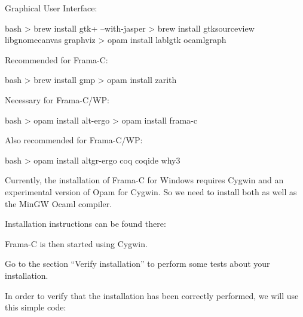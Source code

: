 Graphical User Interface:



\begin{CodeBlock}{bash}
> brew install gtk+ --with-jasper
> brew install gtksourceview libgnomecanvas graphviz
> opam install lablgtk ocamlgraph 
\end{CodeBlock}



Recommended for Frama-C:



\begin{CodeBlock}{bash}
> brew install gmp
> opam install zarith
\end{CodeBlock}



Necessary for Frama-C/WP:



\begin{CodeBlock}{bash}
> opam install alt-ergo
> opam install frama-c
\end{CodeBlock}



Also recommended for Frama-C/WP:



\begin{CodeBlock}{bash}
> opam install altgr-ergo coq coqide why3
\end{CodeBlock}



Currently, the installation of Frama-C for Windows requires Cygwin and
an experimental version of Opam for Cygwin. So we need to install both
as well as the MinGW Ocaml compiler.



Installation instructions can be found there:






Frama-C is then started using Cygwin.



Go to the section ``Verify installation'' to perform some tests about
your installation.






In order to verify that the installation has been correctly performed,
we will use this simple code:



